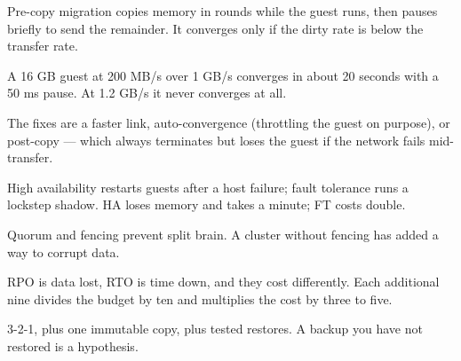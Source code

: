 \begin{chaptersummary}
\begin{tight}
  \item Pre-copy migration copies memory in rounds while the guest runs, then
        pauses briefly to send the remainder. It converges only if the dirty
        rate is below the transfer rate.
  \item A 16 GB guest at 200 MB/s over 1 GB/s converges in about 20 seconds
        with a 50 ms pause. At 1.2 GB/s it never converges at all.
  \item The fixes are a faster link, auto-convergence (throttling the guest on
        purpose), or post-copy --- which always terminates but loses the guest
        if the network fails mid-transfer.
  \item High availability restarts guests after a host failure; fault tolerance
        runs a lockstep shadow. HA loses memory and takes a minute; FT costs
        double.
  \item Quorum and fencing prevent split brain. A cluster without fencing has
        added a way to corrupt data.
  \item RPO is data lost, RTO is time down, and they cost differently. Each
        additional nine divides the budget by ten and multiplies the cost by
        three to five.
  \item 3-2-1, plus one immutable copy, plus tested restores. A backup you have
        not restored is a hypothesis.
\end{tight}
\end{chaptersummary}

